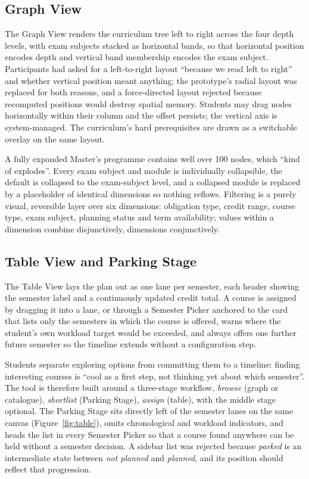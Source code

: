 \documentclass[a4paper,twoside]{article}
\begin{document}
\subsection{Graph View}

The Graph View renders the curriculum tree left to right across the four depth levels, with exam subjects stacked as horizontal bands, so that horizontal position encodes depth and vertical band membership encodes the exam subject. Participants had asked for a left-to-right layout ``because we read left to right'' and whether vertical position meant anything; the prototype's radial layout was replaced for both reasons, and a force-directed layout rejected because recomputed positions would destroy spatial memory. Students may drag nodes horizontally within their column and the offset persists; the vertical axis is system-managed. The curriculum's hard prerequisites are drawn as a switchable overlay on the same layout.

A fully expanded Master's programme contains well over 100 nodes, which ``kind of explodes''. Every exam subject and module is individually collapsible, the default is collapsed to the exam-subject level, and a collapsed module is replaced by a placeholder of identical dimensions so nothing reflows. Filtering is a purely visual, reversible layer over six dimensions: obligation type, credit range, course type, exam subject, planning status and term availability; values within a dimension combine disjunctively, dimensions conjunctively.

\subsection{Table View and Parking Stage}

The Table View lays the plan out as one lane per semester, each header showing the semester label and a continuously updated credit total. A course is assigned by dragging it into a lane, or through a Semester Picker anchored to the card that lists only the semesters in which the course is offered, warns where the student's own workload target would be exceeded, and always offers one further future semester so the timeline extends without a configuration step.

Students separate exploring options from committing them to a timeline: finding interesting courses is ``cool as a first step, not thinking yet about which semester''. The tool is therefore built around a three-stage workflow, \emph{browse} (graph or catalogue), \emph{shortlist} (Parking Stage), \emph{assign} (table), with the middle stage optional. The Parking Stage sits directly left of the semester lanes on the same canvas (Figure~\ref{fig:table}), omits chronological and workload indicators, and heads the list in every Semester Picker so that a course found anywhere can be held without a semester decision. A sidebar list was rejected because \emph{parked} is an intermediate state between \emph{not planned} and \emph{planned}, and its position should reflect that progression.
\end{document}

